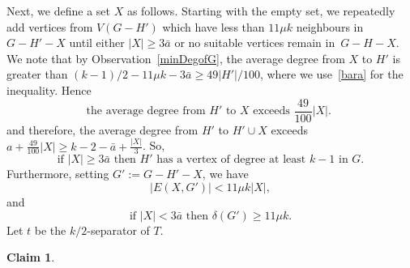 \documentclass[12pt]{article}
\newtheorem{claim}[theorem]{Claim}
\begin{document}
 
 Next, 
we define a set $X$ as follows. Starting with the empty set, we  repeatedly add vertices from $V(G-H')$ which have less than $11 \mu k $ neighbours in  $G-H'-X$ until either $|X|\ge  3 \bar a$  or  no suitable vertices remain in~$G-H-X$. We note that by Observation~\ref{minDegofG}, the average degree  from $X$ to $H'$ is greater than $(k-1)/2-11\mu k -3 \bar a\ge 49|H'|/100$, where we use~\eqref{bara} for the inequality. Hence
\begin{equation}\label{baranew}
    \text{
the average degree from $H'$ to $X$ exceeds $\frac{49}{100}|X|$.
    }
\end{equation}
and therefore, the average degree from $H'$ to $H'\cup X$ exceeds $a+\frac{49}{100}|X|\ge k-2-\bar a+ \frac{|X|}3$. So,
\begin{equation}\label{baranew2}
    \text{if $|X|\ge  3 \bar a$ then  $H'$ has a vertex of degree at least $k-1$ in $G$.}
\end{equation}
Furthermore, setting $G':=G-H'-X$, we have
     \begin{equation}\label{XtoG'}
\text{$|E(X,G')|< 11 \mu k|X|$}, 
   \end{equation}
  and   
   \begin{equation}\label{mindeggg}
\text{if $|X|<3\bar a$ then $\delta(G')\ge 11 \mu k$}.
   \end{equation}
Let $t$ be the $k/2$-separator of $T$.     
 \begin{claim}\label{thasatmostmukleafch}
          \end{claim} 
\end{document}
